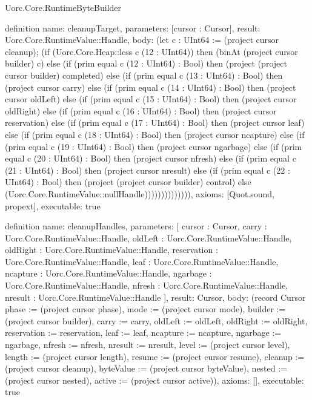 \begin{lexlean}{Uorc.Core.RuntimeByteBuilder}
\begin{semanticmodule}
definition{
  name: cleanupTarget,
  parameters: [cursor : Cursor],
  result: Uorc.Core.RuntimeValue::Handle,
  body: (let c : UInt64 := (project cursor cleanup); (if (Uorc.Core.Heap::less c (12 : UInt64)) then (binAt (project cursor builder) c) else (if (prim equal c (12 : UInt64) : Bool) then (project (project cursor builder) completed) else (if (prim equal c (13 : UInt64) : Bool) then (project cursor carry) else (if (prim equal c (14 : UInt64) : Bool) then (project cursor oldLeft) else (if (prim equal c (15 : UInt64) : Bool) then (project cursor oldRight) else (if (prim equal c (16 : UInt64) : Bool) then (project cursor reservation) else (if (prim equal c (17 : UInt64) : Bool) then (project cursor leaf) else (if (prim equal c (18 : UInt64) : Bool) then (project cursor ncapture) else (if (prim equal c (19 : UInt64) : Bool) then (project cursor ngarbage) else (if (prim equal c (20 : UInt64) : Bool) then (project cursor nfresh) else (if (prim equal c (21 : UInt64) : Bool) then (project cursor nresult) else (if (prim equal c (22 : UInt64) : Bool) then (project (project cursor builder) control) else (Uorc.Core.RuntimeValue::nullHandle)))))))))))))),
  axioms: [Quot.sound, propext],
  executable: true
}

definition{
  name: cleanupHandles,
  parameters: [
    cursor : Cursor,
    carry : Uorc.Core.RuntimeValue::Handle,
    oldLeft : Uorc.Core.RuntimeValue::Handle,
    oldRight : Uorc.Core.RuntimeValue::Handle,
    reservation : Uorc.Core.RuntimeValue::Handle,
    leaf : Uorc.Core.RuntimeValue::Handle,
    ncapture : Uorc.Core.RuntimeValue::Handle,
    ngarbage : Uorc.Core.RuntimeValue::Handle,
    nfresh : Uorc.Core.RuntimeValue::Handle,
    nresult : Uorc.Core.RuntimeValue::Handle
  ],
  result: Cursor,
  body: (record Cursor {phase := (project cursor phase), mode := (project cursor mode), builder := (project cursor builder), carry := carry, oldLeft := oldLeft, oldRight := oldRight, reservation := reservation, leaf := leaf, ncapture := ncapture, ngarbage := ngarbage, nfresh := nfresh, nresult := nresult, level := (project cursor level), length := (project cursor length), resume := (project cursor resume), cleanup := (project cursor cleanup), byteValue := (project cursor byteValue), nested := (project cursor nested), active := (project cursor active)}),
  axioms: [],
  executable: true
}


\end{semanticmodule}
\end{lexlean}
